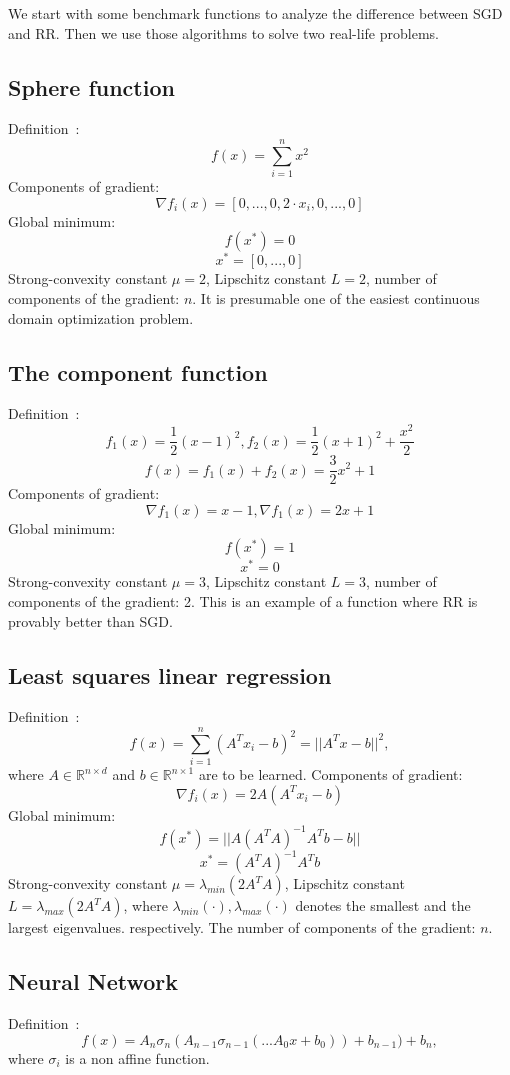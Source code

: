 \documentclass[10pt,conference,compsocconf]{IEEEtran}
\begin{document}
We start with some benchmark functions to analyze the difference between
SGD and RR. Then we use those algorithms to solve two real-life problems.

\subsection{Sphere function}

\noindent Definition~\cite{SPHERE}:
$$f(x) = \sum_{i=1}^n x^2$$
Components of gradient:
$$\nabla f_i(x) = [0,...,0,2\cdot x_i,0,...,0]$$
Global minimum:
$$f(x^*) = 0$$
$$x^* = [0,...,0]$$
Strong-convexity constant $\mu = 2$, Lipschitz constant \mbox{$L=2$},
number of components of the gradient: $n$. It is presumable one of
the easiest continuous domain optimization problem.

\subsection{The component function}
\noindent Definition~\cite{COMPONENTFUNCTION}:
$$f_1(x) = \frac{1}{2}(x-1)^2, f_2(x) = \frac{1}{2}(x+1)^2 + \frac{x^2}{2}$$
$$f(x) = f_1(x) + f_2(x) = \frac{3}{2} x^2 + 1$$
Components of gradient:
$$\nabla f_1(x) = x - 1, \nabla f_1(x) = 2x + 1$$
Global minimum:
$$f(x^*) = 1$$
$$x^* = 0$$
Strong-convexity constant $\mu = 3$, Lipschitz constant \mbox{$L=3$},
number of components of the gradient: 2. This is an example of a function where RR is provably better than SGD. \cite{COMPONENTFUNCTION}

\subsection{Least squares linear regression}

\noindent Definition~\cite{REGRESSION}:
$$f(x) = \sum_{i=1}^n (A^T x_i-b)^2 = ||A^T x-b||^2,$$
\noindent where $A \in \mathbb{R}^{n \times d}$ and $b \in \mathbb{R}^{n
\times 1}$ are to be learned.
Components of gradient:
$$\nabla f_i(x) = 2 A(A^T x_i - b)$$
Global minimum:
$$f(x^*) = ||A (A^T A)^{-1} A^T b - b||$$
$$x^* = (A^T A)^{-1} A^T b$$
Strong-convexity constant $\mu = \lambda_{min}(2A^TA)$, Lipschitz constant
\mbox{$L=\lambda_{max}(2A^TA)$}, where $\lambda_{min}(\cdot),
\lambda_{max}(\cdot)$ denotes the smallest and the largest
eigenvalues. respectively. The number of components of the gradient: $n$.

\subsection{Neural Network}
\noindent Definition~\cite{NEURALNETWORK}:
$$f(x) =  A_{n} \sigma_n(A_{n-1}\sigma_{n-1}(... A_0 x + b_0)) + b_{n-1}) + b_n,$$
\noindent where $\sigma_i$ is a non affine function. 
\end{document}
